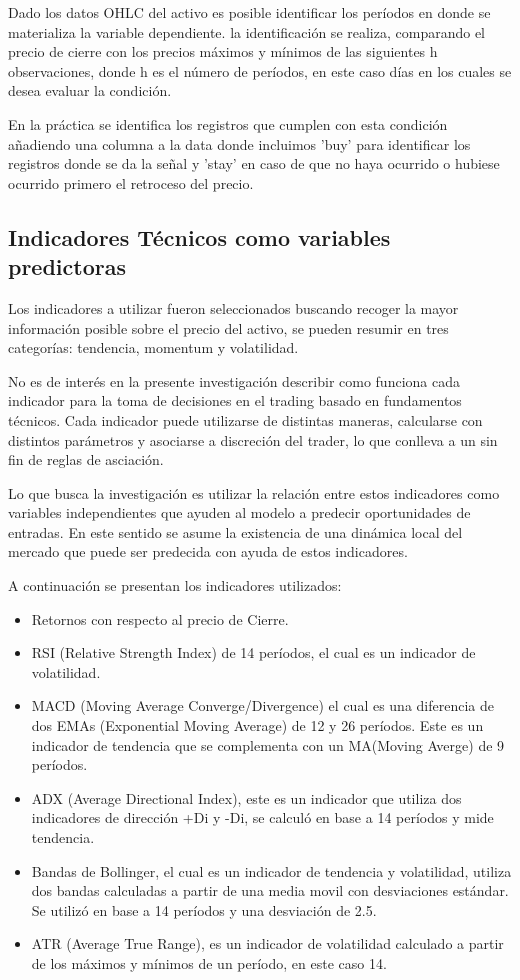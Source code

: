 \documentclass[a4paper,12pt]{Latex/Classes/PhDthesisPSnPDF}
\begin{document}
Dado los datos OHLC del activo es posible identificar los períodos en donde se materializa la variable dependiente. la identificación se realiza, comparando el precio de cierre con los precios máximos y mínimos de las siguientes h observaciones, donde h es el número de períodos, en este caso días en los cuales se desea evaluar la condición.

En la práctica se identifica los registros que cumplen con esta condición añadiendo una columna a la data donde incluimos 'buy' para identificar los registros donde se da la señal y 'stay' en caso de que no haya ocurrido o hubiese ocurrido primero el retroceso del precio.

\subsection{Indicadores Técnicos como variables predictoras}

Los indicadores a utilizar fueron seleccionados buscando recoger la mayor información posible sobre el precio del activo, se pueden resumir en tres categorías: tendencia, momentum y volatilidad.

No es de interés en la presente investigación describir como funciona cada indicador para la toma de decisiones en el trading basado en fundamentos técnicos. Cada indicador puede utilizarse de distintas maneras, calcularse con distintos parámetros y asociarse a discreción del trader, lo que conlleva a un sin fin de reglas de asciación. 

Lo que busca la investigación es utilizar la relación entre estos indicadores como variables independientes que ayuden al modelo a predecir oportunidades de entradas. En este sentido se asume la existencia de una dinámica local del mercado que puede ser predecida con ayuda de estos indicadores.

A continuación se presentan los indicadores utilizados:

\begin{itemize}
\item Retornos con respecto al precio de Cierre.
\item RSI (Relative Strength Index) de 14 períodos, el cual es un indicador de volatilidad.
\item MACD (Moving Average Converge/Divergence) el cual es una diferencia de dos EMAs (Exponential Moving Average) de 12 y 26 períodos. Este es un indicador de tendencia que se complementa con un MA(Moving Averge) de 9 períodos. 
\item ADX (Average Directional Index), este es un indicador que utiliza dos indicadores de dirección +Di y -Di, se calculó en base a 14 períodos y mide tendencia.
\item Bandas de Bollinger, el cual es un indicador de tendencia y volatilidad, utiliza dos bandas calculadas a partir de una media movil con desviaciones estándar. Se utilizó en base a 14 períodos y una desviación de 2.5.
\item ATR (Average True Range), es un indicador de volatilidad calculado a partir de los máximos y mínimos de un período, en este caso 14.
\end{itemize}
\end{document}
